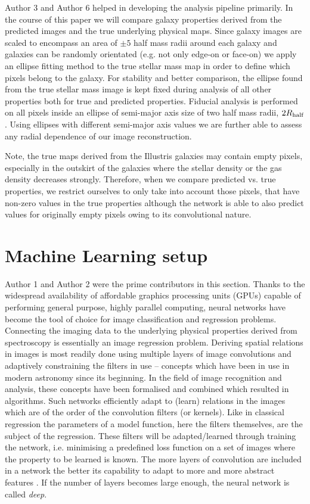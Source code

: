 \documentclass[conference]{IEEEtran}
\begin{document}
Author 3 and Author 6 helped in developing the analysis pipeline primarily. In the course of this paper we will compare galaxy properties derived from the predicted images and the true underlying physical maps. Since galaxy images are scaled to encompass an area of $\pm5$ half mass radii around each galaxy and galaxies can be randomly orientated (e.g. not only edge-on or face-on) we apply an ellipse fitting method to the true stellar mass map in order to define which pixels belong to the galaxy. For stability and better comparison, the ellipse found from the true stellar mass image is kept fixed during analysis of all other properties both for true and predicted properties. Fiducial analysis is performed on all pixels inside an ellipse of semi-major axis size of two half mass radii, $2R_{\rm half}$. Using ellipses with different semi-major axis values we are further able to assess any radial dependence of our image reconstruction. 

Note, the true maps derived from the Illustris galaxies may contain empty pixels, especially in the outskirt of the galaxies where the stellar density or the gas density decreases strongly. Therefore, when we compare predicted vs. true properties, we restrict ourselves to only take into account those pixels, that have non-zero values in the true properties although the network is able to also predict values for originally empty pixels owing to its convolutional nature.  

\section{Machine Learning setup} \label{subsec:ML}

Author 1 and Author 2 were the prime contributors in this section. Thanks to the widespread availability of affordable graphics processing units (GPUs) capable of performing general purpose, highly parallel computing, neural networks have become the tool of choice for image classification and regression problems. Connecting the imaging data to the underlying physical properties derived from spectroscopy is essentially an image regression problem. Deriving spatial relations in images is most readily done using multiple layers of image convolutions and adaptively constraining the filters in use \citep[see e.g.][]{Krizhevsky2012} -- concepts which have been in use in modern astronomy since its beginning. 
In the field of image recognition and analysis, these concepts have been formalised and combined which resulted in algorithms. Such networks efficiently adapt to (learn) relations in the images which are of the order of the convolution filters (or kernels). Like in classical regression the parameters of a model function, here the filters themselves, are the subject of the regression. These filters will be adapted/learned through training the network, i.e. minimising a predefined loss function on a set of images where the property to be learned is known. The more layers of convolution are included in a network the better its capability to adapt to more and more abstract features \citep{Zeiler2014}. If the number of layers becomes large enough, the neural network is called \textit{deep}.
\end{document}
